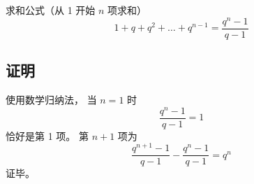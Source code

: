 
\begin{issues}
\issueAbstract
\issueNeedCite
{}
\end{issues}



求和公式（从 1 开始 $n$ 项求和）
\begin{equation}
1 + q + q^2 + \dots + q^{n-1} = \frac{q^n - 1}{q - 1}
\end{equation}

\subsection{证明}
使用数学归纳法， 当 $n = 1$ 时
\begin{equation}
\frac{q^n - 1}{q - 1} = 1
\end{equation}
恰好是第 1 项。 第 $n + 1$ 项为
\begin{equation}
\frac{q^{n+1} - 1}{q - 1} - \frac{q^n - 1}{q - 1} = q^n
\end{equation}
证毕。
